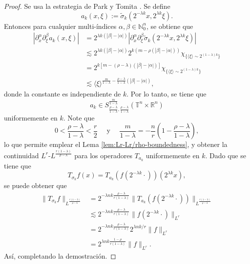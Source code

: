 \begin{proof}
	Se usa la estrategia de Park y Tomita \cite{park-tomita}. Se define    
	\begin{equation*}
		a_k(x, \xi) := \tilde{\sigma}_k(2^{-\lambda k}x, 2^{\lambda k} \xi).
	\end{equation*}
	Entonces para cualquier multi-índices $\alpha, \beta \in \mathbb{N}_0^n$, se obtiene que
	\begin{align*}
		|\partial_x^\alpha\partial_\xi^\beta a_k(x, \xi)| & = 2^{\lambda k(|\beta|-|\alpha|)} |\partial_x^\alpha\partial_\xi^\beta \tilde{\sigma}_k(2^{-\lambda k}x, 2^{\lambda k} \xi)| \\
		& \lesssim 2^{\lambda k(|\beta|-|\alpha|)} 2^{k(m - \rho(|\beta|-|\alpha|))} \chi_{ \{ \langle\xi\rangle \sim 2^{(1-\lambda)k} \} } \\
		& =  2^{ k[m - (\rho-\lambda)(|\beta|-|\alpha|)] } \chi_{ \{ \langle\xi\rangle \sim 2^{(1-\lambda)k} \} } \\
		& \lesssim  \langle\xi\rangle^{ \frac{m}{1-\lambda}  -  \frac{\rho-\lambda}{1-\lambda}(|\beta|-|\alpha|) },
	\end{align*}
	donde la constante es independiente de $k$. Por lo tanto, se tiene que 
	\begin{equation*}
		a_k \in S^{\frac{m}{1-\lambda}}_{ \frac{\rho-\lambda}{1-\lambda} , \frac{\rho-\lambda}{1-\lambda} } (\mathbb{T}^n\times\mathbb{R}^n)
	\end{equation*}
	uniformemente en $k$. Note que 
	\begin{equation*}
		0 < \frac{\rho-\lambda}{1-\lambda} < \frac{r}{2} \quad \text{ y } \quad \frac{m}{1-\lambda} = -\frac{n}{r} \left(  1 - \frac{\rho-\lambda}{1-\lambda}
		\right),
	\end{equation*}
	lo que permite emplear el Lema \ref{lem:Lr-Lr/rho-boundedness}, y obtener la continuidad $L^r$-$L^\frac{r(1-\lambda)}{\rho-\lambda}$ para los operadores $T_{a_k}$ uniformemente en $k$. Dado que se tiene que 
	\begin{equation*}
		T_{\sigma_k}f(x) = T_{a_k}(f(2^{-\lambda k}\cdot ))(2^{
			\lambda k
		}x),
	\end{equation*}
	se puede obtener que 
	\begin{align*}
		\|T_{\sigma_k}f\|_{L^\frac{r(1-\lambda)}{\rho-\lambda}} &= 2^{ -\lambda nk \frac{\rho-\lambda}{r(1-\lambda)} } \|T_{a_k}(f(2^{-\lambda k} \cdot))\|_{L^\frac{r(1-\lambda)}{\rho-\lambda}} \\
		& \lesssim 2^{ -\lambda nk \frac{\rho-\lambda}{r(1-\lambda)} } \|f(2^{-\lambda k} \cdot)\|_{L^r} \\
		& =  2^{ -\lambda nk \frac{\rho-\lambda}{r(1-\lambda)} } 2^{\lambda nk/r} \|f\|_{L^r} \\
		& =  2^{ \lambda nk \frac{1-\rho}{r(1-\lambda)} } \|f\|_{L^r}.
	\end{align*}
	Así, completando la demostración.
\end{proof}


